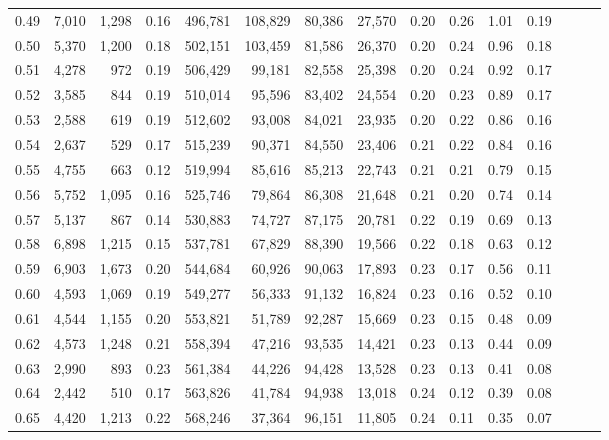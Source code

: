 \begin{tabular}{rrrrrrrrrrrrrrr}
0.49 &   7,010 &  1,298 &  0.16 &  496,781 &  108,829 &   80,386 &   27,570 &  0.20 &  0.26 &  1.01 &      0.19 \\
0.50 &   5,370 &  1,200 &  0.18 &  502,151 &  103,459 &   81,586 &   26,370 &  0.20 &  0.24 &  0.96 &      0.18 \\
0.51 &   4,278 &    972 &  0.19 &  506,429 &   99,181 &   82,558 &   25,398 &  0.20 &  0.24 &  0.92 &      0.17 \\
0.52 &   3,585 &    844 &  0.19 &  510,014 &   95,596 &   83,402 &   24,554 &  0.20 &  0.23 &  0.89 &      0.17 \\
0.53 &   2,588 &    619 &  0.19 &  512,602 &   93,008 &   84,021 &   23,935 &  0.20 &  0.22 &  0.86 &      0.16 \\
0.54 &   2,637 &    529 &  0.17 &  515,239 &   90,371 &   84,550 &   23,406 &  0.21 &  0.22 &  0.84 &      0.16 \\
0.55 &   4,755 &    663 &  0.12 &  519,994 &   85,616 &   85,213 &   22,743 &  0.21 &  0.21 &  0.79 &      0.15 \\
0.56 &   5,752 &  1,095 &  0.16 &  525,746 &   79,864 &   86,308 &   21,648 &  0.21 &  0.20 &  0.74 &      0.14 \\
0.57 &   5,137 &    867 &  0.14 &  530,883 &   74,727 &   87,175 &   20,781 &  0.22 &  0.19 &  0.69 &      0.13 \\
0.58 &   6,898 &  1,215 &  0.15 &  537,781 &   67,829 &   88,390 &   19,566 &  0.22 &  0.18 &  0.63 &      0.12 \\
0.59 &   6,903 &  1,673 &  0.20 &  544,684 &   60,926 &   90,063 &   17,893 &  0.23 &  0.17 &  0.56 &      0.11 \\
0.60 &   4,593 &  1,069 &  0.19 &  549,277 &   56,333 &   91,132 &   16,824 &  0.23 &  0.16 &  0.52 &      0.10 \\
0.61 &   4,544 &  1,155 &  0.20 &  553,821 &   51,789 &   92,287 &   15,669 &  0.23 &  0.15 &  0.48 &      0.09 \\
0.62 &   4,573 &  1,248 &  0.21 &  558,394 &   47,216 &   93,535 &   14,421 &  0.23 &  0.13 &  0.44 &      0.09 \\
0.63 &   2,990 &    893 &  0.23 &  561,384 &   44,226 &   94,428 &   13,528 &  0.23 &  0.13 &  0.41 &      0.08 \\
0.64 &   2,442 &    510 &  0.17 &  563,826 &   41,784 &   94,938 &   13,018 &  0.24 &  0.12 &  0.39 &      0.08 \\
0.65 &   4,420 &  1,213 &  0.22 &  568,246 &   37,364 &   96,151 &   11,805 &  0.24 &  0.11 &  0.35 &      0.07 \\

\end{tabular}

